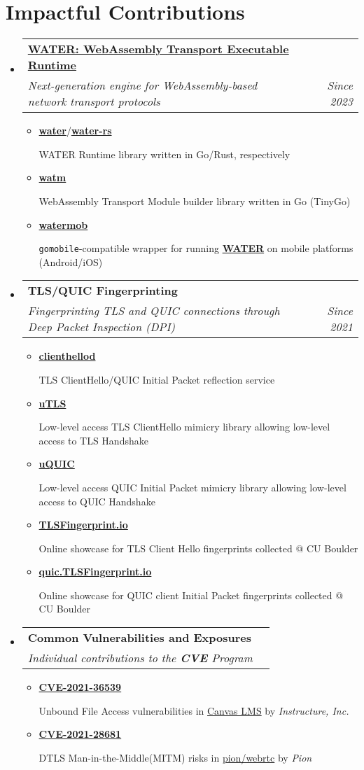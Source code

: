 \documentclass[letterpaper,11pt]{article}
\makeatletter
\newcommand{\resumeItem}[1]{
  \item\small{
    {#1 \vspace{-2pt}}
  }
}
\newcommand{\resumeSubheading}[4]{
  \vspace{-2pt}\item
    \begin{tabular*}{0.97\textwidth}[t]{l@{\extracolsep{\fill}}r}
      \textbf{#1} & #2 \\
      \textit{\small#3} & \textit{\small #4} \\
    \end{tabular*}\vspace{-7pt}
}
\newcommand{\resumeSubHeadingListStart}{\begin{itemize}[leftmargin=0.15in, label={}]}
\newcommand{\resumeSubHeadingListEnd}{\end{itemize}}
\newcommand{\resumeItemListStart}{\begin{itemize}}
\newcommand{\resumeItemListEnd}{\end{itemize}\vspace{-5pt}}
\makeatother
\begin{document}
\section{Impactful Contributions}
\resumeSubHeadingListStart
\resumeSubheading
{\href{https://water.refraction.network}{\textbf{WATER: WebAssembly Transport Executable Runtime}}}{}
{Next-generation engine for WebAssembly-based network transport protocols}{Since 2023}
\resumeItemListStart
  \resumeItem{\href{https://github.com/refraction-networking/water}{\textbf{water}}/\href{https://github.com/refraction-networking/water-rs}{\textbf{water-rs}}}
    {WATER Runtime library written in Go/Rust, respectively}
  \resumeItem{\href{https://github.com/refraction-networking/watm}{\textbf{watm}}}
    {WebAssembly Transport Module builder library written in Go (TinyGo)}
  \resumeItem{\href{https://github.com/gaukas/watermob}{\textbf{watermob}}}
    {\texttt{gomobile}-compatible wrapper for running \href{https://github.com/refraction-networking/water}{\textbf{WATER}} on mobile platforms (Android/iOS)}
\resumeItemListEnd
\resumeSubheading
{\textbf{TLS/QUIC Fingerprinting}}{}
{Fingerprinting TLS and QUIC connections through Deep Packet Inspection (DPI)}{Since 2021}
\resumeItemListStart
  \resumeItem{\href{https://github.com/gaukas/clienthellod}{\textbf{clienthellod}}}
    {TLS ClientHello/QUIC Initial Packet reflection service}
  \resumeItem{\href{https://github.com/refraction-networking/utls}{\textbf{uTLS}}}
    {Low-level access TLS ClientHello mimicry library allowing low-level access to TLS Handshake}
  \resumeItem{\href{https://github.com/refraction-networking/uquic}{\textbf{uQUIC}}}
    {Low-level access QUIC Initial Packet mimicry library allowing low-level access to QUIC Handshake}
  \resumeItem{\href{https://tlsfingerprint.io}{\textbf{TLSFingerprint.io}}}
    {Online showcase for TLS Client Hello fingerprints collected @ CU Boulder}
  \resumeItem{\href{https://quic.tlsfingerprint.io}{\textbf{quic.TLSFingerprint.io}}}
    {Online showcase for QUIC client Initial Packet fingerprints collected @ CU Boulder}  
\resumeItemListEnd
\resumeSubheading
{\textbf{Common Vulnerabilities and Exposures}}{}
{Individual contributions to the \textbf{CVE\textsuperscript{\textregistered}} Program}{}
\resumeItemListStart
  \resumeItem{\href{https://www.cve.org/CVERecord?id=CVE-2021-36539}{\textbf{CVE-2021-36539}}}
    {Unbound File Access vulnerabilities in \href{https://www.instructure.com/canvas}{Canvas LMS} by \emph{Instructure, Inc.}}
  \resumeItem{\href{https://www.cve.org/CVERecord?id=CVE-2021-28681}{\textbf{CVE-2021-28681}}}
    {DTLS Man-in-the-Middle(MITM) risks in \href{https://github.com/pion/webrtc}{pion/webrtc} by \emph{Pion}}
\resumeItemListEnd
\resumeSubHeadingListEnd
\vspace{1pt}
\end{document}
